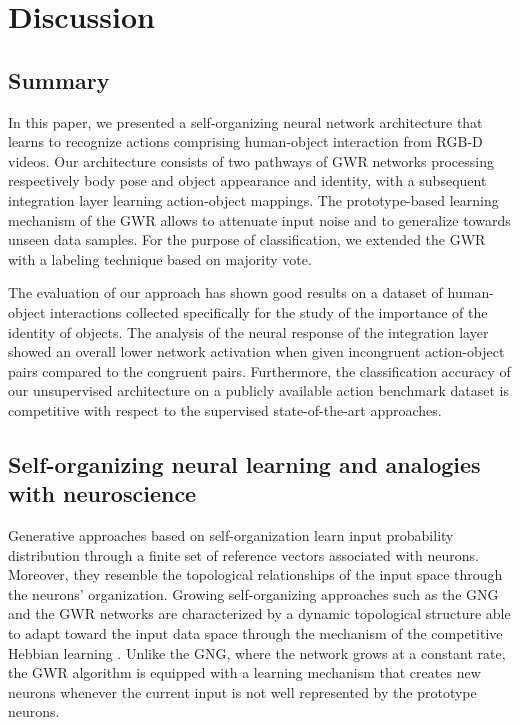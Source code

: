 \documentclass[5p,times]{elsarticle}
\begin{document}
\section{Discussion}\label{sec:discussion}

\subsection{Summary}

In this paper, we presented a self-organizing neural network architecture that learns to recognize actions comprising human-object interaction from RGB-D videos.
Our architecture consists of two pathways of GWR networks processing respectively body pose and object appearance and identity, with a subsequent integration layer learning action-object mappings.
The prototype-based learning mechanism of the GWR allows to attenuate input noise and to generalize towards unseen data samples.
For the purpose of classification, we extended the GWR with a labeling technique based on majority vote. 

The evaluation of our approach has shown good results on a dataset of human-object interactions collected specifically for the study of the importance of the identity of objects.
The analysis of the neural response of the integration layer showed an overall lower network activation when given incongruent action-object pairs compared to the congruent pairs.
Furthermore, the classification accuracy of our unsupervised architecture on a publicly available action benchmark dataset is competitive with respect to the supervised state-of-the-art approaches. 

\subsection{Self-organizing neural learning and analogies with neuroscience}

Generative approaches based on self-organization learn input probability distribution through a finite set of reference vectors associated with neurons.
Moreover, they resemble the topological relationships of the input space through the neurons' organization. 
Growing self-organizing approaches such as the GNG \citep{fritzke1995growing} and the GWR networks \citep{marsland2002self} are characterized by a dynamic topological structure able to adapt toward the input data space through the mechanism of the competitive Hebbian learning \citep{martinetz1993competitive}. 
Unlike the GNG, where the network grows at a constant rate, the GWR algorithm is equipped with a learning mechanism that creates new neurons whenever the current input is not well represented by the prototype neurons.
\end{document}
